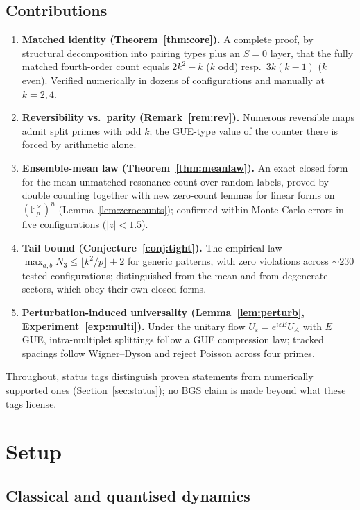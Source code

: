 \documentclass[11pt]{article}
\begin{document}
\subsection*{Contributions}
\begin{enumerate}
\item \textbf{Matched identity (Theorem~\ref{thm:core}).} A complete
proof, by structural decomposition into pairing types plus an
$S=0$ layer, that the fully matched fourth-order count equals
$2k^2-k$ ($k$ odd) resp.\ $3k(k-1)$ ($k$ even). Verified numerically
in dozens of configurations and manually at $k=2,4$.
\item \textbf{Reversibility vs.\ parity (Remark~\ref{rem:rev}).}
Numerous reversible maps admit split primes with odd $k$; the GUE-type
value of the counter there is forced by arithmetic alone.
\item \textbf{Ensemble-mean law (Theorem~\ref{thm:meanlaw}).} An exact
closed form for the mean unmatched resonance count over random labels,
proved by double counting together with new zero-count lemmas for
linear forms on $(\mathbb F_p^\times)^n$
(Lemma~\ref{lem:zerocounts}); confirmed within Monte-Carlo errors in
five configurations ($|z|<1.5$).
\item \textbf{Tail bound (Conjecture~\ref{conj:tight}).} The empirical
law $\max_{a,b}N_3\le\lfloor k^2/p\rfloor+2$ for generic patterns,
with zero violations across ${\sim}230$ tested configurations;
distinguished from the mean and from degenerate sectors, which obey
their own closed forms.
\item \textbf{Perturbation-induced universality
(Lemma~\ref{lem:perturb}, Experiment~\ref{exp:multi}).} Under the
unitary flow $U_\varepsilon=e^{i\varepsilon E}U_A$ with $E$ GUE,
intra-multiplet splittings follow a GUE compression law; tracked
spacings follow Wigner--Dyson and reject Poisson across four primes.
\end{enumerate}

Throughout, status tags distinguish proven statements from
numerically supported ones (Section~\ref{sec:status}); no BGS claim is
made beyond what these tags license.

\section{Setup}\label{sec:setup}

\subsection{Classical and quantised dynamics}
\end{document}
